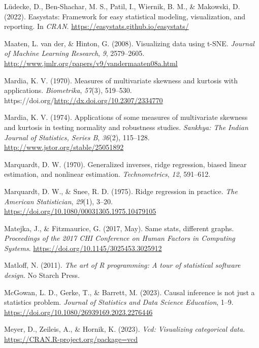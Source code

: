 \documentclass[
  letterpaper,
  10pt,
  krantz2]{krantz}
\newlength{\cslhangindent}
\newenvironment{CSLReferences}[2] %
 {\begin{list}{}{%
  \setlength{\itemindent}{0pt}
  \setlength{\leftmargin}{0pt}
  \setlength{\parsep}{0pt}
  \ifodd #1
   \setlength{\leftmargin}{\cslhangindent}
   \setlength{\itemindent}{-1\cslhangindent}
  \fi
  \setlength{\itemsep}{#2\baselineskip}}}
 {\end{list}}
\begin{document}
\begin{CSLReferences}{1}{0}
Lüdecke, D., Ben-Shachar, M. S., Patil, I., Wiernik, B. M., \& Makowski,
D. (2022). Easystats: Framework for easy statistical modeling,
visualization, and reporting. In \emph{CRAN}.
\url{https://easystats.github.io/easystats/}

Maaten, L. van der, \& Hinton, G. (2008). Visualizing data using
{t-SNE}. \emph{Journal of Machine Learning Research}, \emph{9},
2579--2605. \url{http://www.jmlr.org/papers/v9/vandermaaten08a.html}

Mardia, K. V. (1970). Measures of multivariate skewness and kurtosis
with applications. \emph{Biometrika}, \emph{57}(3), 519--530.
https://doi.org/\url{http://dx.doi.org/10.2307/2334770}

Mardia, K. V. (1974). Applications of some measures of multivariate
skewness and kurtosis in testing normality and robustness studies.
\emph{Sankhya: The Indian Journal of Statistics, Series B},
\emph{36}(2), 115--128. \url{http://www.jstor.org/stable/25051892}

Marquardt, D. W. (1970). Generalized inverses, ridge regression, biased
linear estimation, and nonlinear estimation. \emph{Technometrics},
\emph{12}, 591--612.

Marquardt, D. W., \& Snee, R. D. (1975). Ridge regression in practice.
\emph{The American Statistician}, \emph{29}(1), 3--20.
\url{https://doi.org/10.1080/00031305.1975.10479105}

Matejka, J., \& Fitzmaurice, G. (2017, May). Same stats, different
graphs. \emph{Proceedings of the 2017 {CHI} Conference on Human Factors
in Computing Systems}. \url{https://doi.org/10.1145/3025453.3025912}

Matloff, N. (2011). \emph{The art of {R} programming: {A} tour of
statistical software design}. No Starch Press.

McGowan, L. D., Gerke, T., \& Barrett, M. (2023). Causal inference is
not just a statistics problem. \emph{Journal of Statistics and Data
Science Education}, 1--9.
\url{https://doi.org/10.1080/26939169.2023.2276446}

Meyer, D., Zeileis, A., \& Hornik, K. (2023). \emph{Vcd: Visualizing
categorical data}. \url{https://CRAN.R-project.org/package=vcd}


\end{CSLReferences}
\end{document}
